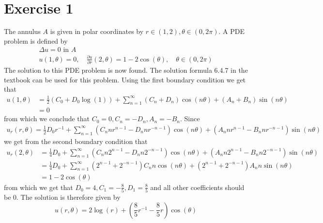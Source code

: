 \def\homeworknumber{3}
\def\homeworkdate{24-10-2011}




    \maketitle

    \section*{Exercise 1}
    The annulus $A$ is given in polar coordinates by $r\in(1,2), \theta\in(0,2\pi)$. A PDE problem is defined by
    \begin{gather}
        \Delta u = 0 \text{ in }A \\
        u(1,\theta) = 0,\quad \frac{\partial u}{\partial r}(2,\theta) = 1 - 2\cos(\theta),\quad \theta\in(0,2\pi)
    \end{gather}
    The solution to this PDE problem is now found. The solution formula 6.4.7 in the textbook can be used for this problem. Using the first boundary condition we get that
    \begin{align*}
        u(1,\theta) &= \frac{1}{2}(C_0 + D_0\log(1)) + \sum_{n=1}^\infty (C_n+D_n)\cos(n\theta) + (A_n+B_n)\sin(n\theta) \\
        &= 0
    \end{align*}
    from which we conclude that $C_0=0, C_n=-D_n, A_n=-B_n$. Since
    \begin{align*}
        u_r(r, \theta) = \frac{1}{2}D_0r^{-1} + \sum_{n=1}^\infty (C_n n r^{n-1} - D_n n r^{-n-1})\cos(n\theta) + (A_n n r^{n-1} - B_n n r^{-n-1})\sin(n\theta)
    \end{align*}
    we get from the second boundary condition that
    \begin{align*}
        u_r(2, \theta) &= \frac{1}{4}D_0 + \sum_{n=1}^\infty (C_n n 2^{n-1} - D_n n 2^{-n-1})\cos(n\theta) + (A_n n 2^{n-1} - B_n n 2^{-n-1})\sin(n\theta) \\
        &= \frac{1}{4}D_0 + \sum_{n=1}^\infty (2^{n-1} + 2^{-n-1})C_n n \cos(n\theta) + (2^{n-1} + 2^{-n-1})A_n n \sin(n\theta) \\
        &= 1 - 2\cos(\theta)
    \end{align*}
    from which we get that $D_0=4, C_1=-\frac{8}{5}, D_1=\frac{8}{5}$ and all other coefficients should be 0. The solution is therefore given by
    \begin{equation*}
        u(r, \theta) = 2\log{(r)} + (\frac{8}{5}r^{-1} - \frac{8}{5}r)\cos(\theta)
    \end{equation*}
